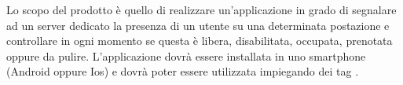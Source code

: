 Lo scopo del prodotto è quello di realizzare un’applicazione in grado di segnalare
 ad un server dedicato la presenza di un utente su una determinata postazione e 
 controllare in ogni momento se questa è libera, disabilitata, occupata, prenotata oppure da pulire. 
 L’applicazione dovrà essere installata in uno smartphone (Android oppure Ios) e dovrà poter essere 
 utilizzata impiegando dei tag .